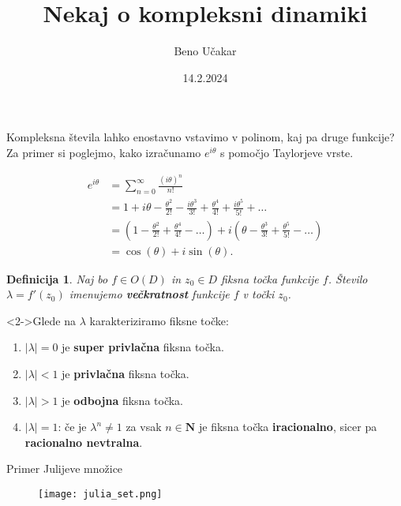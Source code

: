 \documentclass{beamer}
\title{Nekaj o kompleksni dinamiki}
\author{Beno Učakar}
\date{14.2.2024}
\newtheorem{definicija}{Definicija}
\begin{document}
\maketitle%

\begin{frame}
    Kompleksna števila lahko enostavno vstavimo v polinom, kaj pa druge funkcije? 
    Za primer si poglejmo, kako izračunamo $e^{i\theta}$ s pomočjo Taylorjeve vrste.
    
   
        
        \begin{align*}
             e^{i\theta} & = \sum_{n=0}^{\infty} \frac{(i\theta)^n}{n!} \\
                         & = 1 + i\theta - \frac{\theta^2}{2!} - \frac{i\theta^3}{3!} + \frac{\theta^4}{4!} + \frac{i\theta^5}{5!} + \ldots \\
                         & = \left( 1 - \frac{\theta^2}{2!} + \frac{\theta^4}{4!} - \ldots \right) 
                            + i \left(\theta - \frac{\theta^3}{3!} + \frac{\theta^5}{5!} - \ldots \right) \\
                         & = \cos(\theta) + i\sin(\theta).
        \end{align*}
 
\end{frame}

\begin{frame}

        
        \begin{definicija}
            Naj bo $f \in O(D)$ in $z_0 \in D$ fiksna točka funkcije $f$.
            Število $\lambda = f'(z_0)$ imenujemo \textbf{večkratnost} funkcije $f$ v točki $z_0$.
        \end{definicija}
    

    \begin{exampleblock}<2->{Glede na $\lambda$ karakteriziramo fiksne točke:}
        \begin{enumerate} 
            \item<2-> $|\lambda| = 0$ je \textbf{super privlačna} fiksna točka.
            \item<3-> $|\lambda| < 1$ je \textbf{privlačna} fiksna točka.
            \item<4-> $|\lambda| > 1$ je \textbf{odbojna} fiksna točka.
            \item<5-> $|\lambda| = 1$: 
                če je $\lambda^n \neq 1$ za vsak $n \in \mathbf{N}$ je fiksna točka \textbf{iracionalno},
                sicer pa \textbf{racionalno nevtralna}.
        \end{enumerate}
    \end{exampleblock}
\end{frame}

\begin{frame}{Primer Julijeve množice}
\begin{figure}
    \centering
    \texttt{[image: julia\_set.png]}
\end{figure}
\end{frame}
\end{document}
